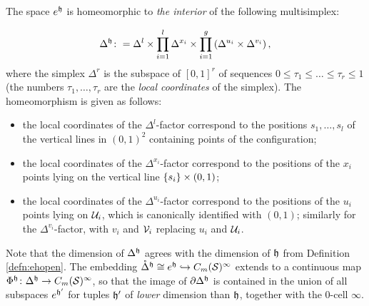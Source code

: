 The space $e^{\mathfrak{h}}$ is homeomorphic to \emph{the interior} of the following multisimplex:

\[
 \Delta^{\mathfrak{h}}\colon =
 \Delta^l\times\prod_{i=1}^l\Delta^{x_i}\times\prod_{i=1}^g\left(\Delta^{u_i}\times\Delta^{v_i}\right),
\]
where the simplex $\Delta^r$ is the subspace of $[0,1]^r$ of sequences $0\leq \tau_1\leq\dots\leq\tau_r\leq 1$
(the numbers $\tau_1,\dots,\tau_r$ are the \emph{local coordinates} of the simplex). The homeomorphism is given
as follows:
\begin{itemize}
 \item the local coordinates of the $\Delta^l$-factor correspond to the positions $s_1,\dots,s_l$ of the vertical
 lines in $(0,1)^2$ containing points of the configuration;
 \item the local coordinates of the $\Delta^{x_i}$-factor correspond to the positions of the $x_i$ points
 lying on the vertical line $\left\{s_i\right\}\times(0,1)$;
 \item the local coordinates of the $\Delta^{u_i}$-factor correspond to the positions of the $u_i$ points
 lying on $\mathcal{U}_i$, which is canonically identified with $(0,1)$; similarly for the $\Delta^{v_i}$-factor,
 with $v_i$ and $\mathcal{V}_i$ replacing $u_i$ and $\mathcal{U}_i$.
\end{itemize}
Note that the dimension of $\Delta^{\mathfrak{h}}$ agrees with the dimension of $\mathfrak{h}$ from Definition \ref{defn:ehopen}.
The embedding $\mathring{\Delta}^{\mathfrak{h}}\cong e^{\mathfrak{h}}\hookrightarrow C_m(\mathcal{S})^{\infty}$ extends to a continuous map
$\Phi^{\mathfrak{h}}\colon\Delta^{\mathfrak{h}}\to C_m(\mathcal{S})^{\infty}$, so that the image of $\partial\Delta^{\mathfrak{h}}$ is contained in the union of
all subspaces $e^{\mathfrak{h}'}$ for tuples $\mathfrak{h}'$ of \emph{lower} dimension than $\mathfrak{h}$, together with the $0$-cell $\infty$.

